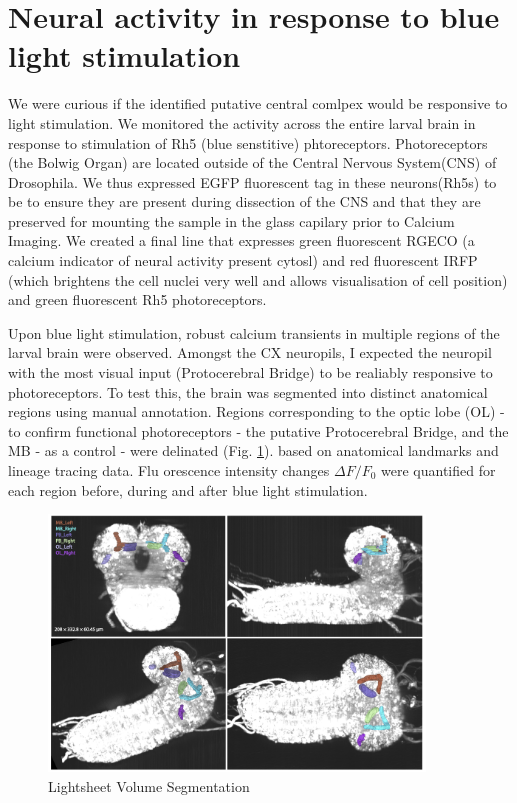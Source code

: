 \section{Neural activity in response to blue light stimulation}
We were curious if the identified putative central comlpex would be responsive to light stimulation. 
We monitored the activity across the entire larval brain in response to stimulation of Rh5 (blue senstitive) phtoreceptors. Photoreceptors (the Bolwig Organ) are located outside of the Central Nervous System(CNS) of Drosophila. We thus expressed  EGFP fluorescent tag in these neurons(Rh5s) to be to ensure they are present during dissection of the CNS and that they are preserved for mounting the sample in the glass capilary prior to Calcium Imaging. We created a final line that expresses green fluorescent RGECO (a calcium indicator of neural activity present cytosl) and red fluorescent IRFP (which brightens the cell nuclei very well and allows visualisation of cell position) and green fluorescent Rh5 photoreceptors. 


Upon blue light stimulation, robust calcium transients in multiple regions of the larval brain were observed. Amongst the CX neuropils, I expected the neuropil with the most visual input (Protocerebral Bridge) to be realiably responsive to photoreceptors. To test this, the brain was segmented into distinct anatomical regions using manual annotation. Regions corresponding to the optic lobe (OL) - to confirm functional photoreceptors - the putative Protocerebral Bridge, and the MB - as a control -  were delinated (Fig. \ref{LSSegmentation}).
based on anatomical landmarks and lineage tracing data. Flu orescence intensity changes $\Delta F/F_0$ were quantified for each region before, during and after blue light stimulation. 

   \begin{figure}
        \centering
        \includegraphics[width=10cm]{Figs/CX/LSSegmentation.pdf}
        \caption[Lightsheet volume Segmentation]{Lightsheet Volume Segmentation}
        \label{LSSegmentation}
    \end{figure}

